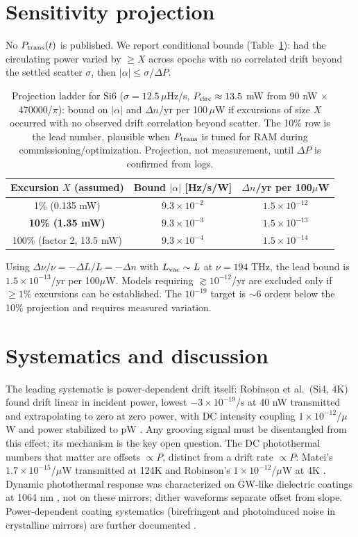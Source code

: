 \documentclass[11pt, a4paper]{article}
\begin{document}
\section{Sensitivity projection}
No $P_{\rm trans}(t)$ is published. We report conditional bounds (Table~\ref{tab:ladder}): had the circulating power varied by $\ge X$ across epochs with no correlated drift beyond the settled scatter $\sigma$, then $|\alpha|\le\sigma/\Delta P$.

\begin{table}[h]
\centering
\caption{Projection ladder for Si6 ($\sigma=12.5\,\mu$Hz/s, $P_{\rm circ}\approx13.5$ mW from 90 nW $\times$ 470000/$\pi$): bound on $|\alpha|$ and $\Delta n$/yr per 100\,$\mu$W if excursions of size $X$ occurred with no observed drift correlation beyond scatter. The 10\% row is the lead number, plausible when $P_{\rm trans}$ is tuned for RAM during commissioning/optimization. Projection, not measurement, until $\Delta P$ is confirmed from logs.}
\label{tab:ladder}
\begin{tabular}{@{}ccc@{}}
\toprule
Excursion $X$ (assumed) & Bound $|\alpha|$ [Hz/s/W] & $\Delta n$/yr per 100$\mu$W \\
\midrule
1\% (0.135 mW) & $9.3\times10^{-2}$ & $1.5\times10^{-12}$ \\
\textbf{10\% (1.35 mW)} & $9.3\times10^{-3}$ & $1.5\times10^{-13}$ \\
100\% (factor 2, 13.5 mW) & $9.3\times10^{-4}$ & $1.5\times10^{-14}$ \\
\bottomrule
\end{tabular}
\end{table}

Using $\Delta\nu/\nu=-\Delta L/L=-\Delta n$ with $L_{\rm vac}\sim L$ at $\nu=194$ THz, the lead bound is $1.5\times10^{-13}$/yr per 100$\mu$W. Models requiring $\gtrsim10^{-12}$/yr are excluded only if $\ge1\%$ excursions can be established. The $10^{-19}$ target is $\sim$6 orders below the 10\% projection and requires measured variation.

\section{Systematics and discussion}
\label{sec:sys}
The leading systematic is power-dependent drift itself: Robinson et al.\ (Si4, 4K) found drift linear in incident power, lowest $-3\times10^{-19}$/s at 40 nW transmitted and extrapolating to zero at zero power, with DC intensity coupling $1\times10^{-12}$/$\mu$W and power stabilized to pW \cite{robinson2019}. Any grooving signal must be disentangled from this effect; its mechanism is the key open question. The DC photothermal numbers that matter are offsets $\propto P$, distinct from a drift rate $\propto P$: Matei's $1.7\times10^{-15}$/$\mu$W transmitted at 124K \cite{matei2017} and Robinson's $1\times10^{-12}$/$\mu$W at 4K \cite{robinson2019}. Dynamic photothermal response was characterized on GW-like dielectric coatings at 1064 nm \cite{farsi2011}, not on these mirrors; dither waveforms separate offset from slope. Power-dependent coating systematics (birefringent and photoinduced noise in crystalline mirrors) are further documented \cite{kedar2023,yu2023}.
\end{document}
